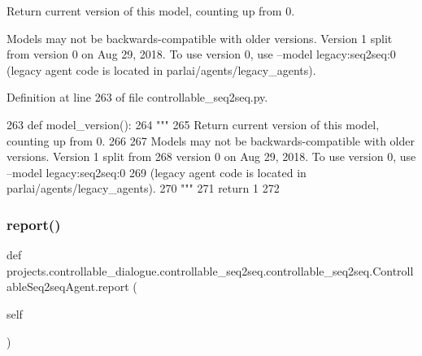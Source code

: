 \begin{DoxyVerb}Return current version of this model, counting up from 0.

Models may not be backwards-compatible with older versions. Version 1 split from
version 0 on Aug 29, 2018. To use version 0, use --model legacy:seq2seq:0
(legacy agent code is located in parlai/agents/legacy_agents).
\end{DoxyVerb}
 

Definition at line 263 of file controllable\+\_\+seq2seq.\+py.


\begin{DoxyCode}
263     \textcolor{keyword}{def }model\_version():
264         \textcolor{stringliteral}{"""}
265 \textcolor{stringliteral}{        Return current version of this model, counting up from 0.}
266 \textcolor{stringliteral}{}
267 \textcolor{stringliteral}{        Models may not be backwards-compatible with older versions. Version 1 split from}
268 \textcolor{stringliteral}{        version 0 on Aug 29, 2018. To use version 0, use --model legacy:seq2seq:0}
269 \textcolor{stringliteral}{        (legacy agent code is located in parlai/agents/legacy\_agents).}
270 \textcolor{stringliteral}{        """}
271         \textcolor{keywordflow}{return} 1
272 
\end{DoxyCode}
\mbox{\label{classprojects_1_1controllable__dialogue_1_1controllable__seq2seq_1_1controllable__seq2seq_1_1ControllableSeq2seqAgent_aa976447be9a59cdba202d947bb5dafbb}} 
\subsubsection{\texorpdfstring{report()}{report()}}
{\footnotesize\ttfamily def projects.\+controllable\+\_\+dialogue.\+controllable\+\_\+seq2seq.\+controllable\+\_\+seq2seq.\+Controllable\+Seq2seq\+Agent.\+report (\begin{DoxyParamCaption}\item[{}]{self }\end{DoxyParamCaption})}

